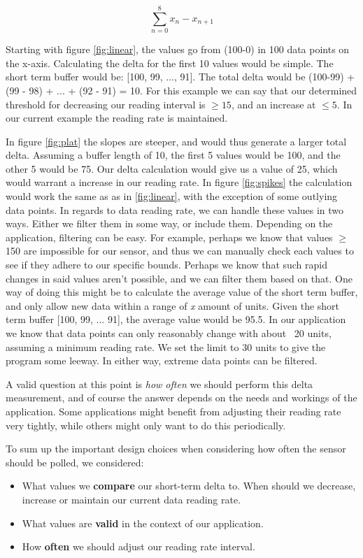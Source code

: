 $$\sum_{n=0}^{8} x_n - x_{n+1}$$

Starting with figure \ref{fig:linear}, the values go from (100-0) in 100 data points on the x-axis. Calculating the delta for the first 10 values would be simple. The short term buffer would be: [100, 99, ..., 91]. The total delta would be (100-99) + (99 - 98) + ... + (92 - 91) = 10. For this example we can say that our determined threshold for decreasing our reading interval is $\geq 15$, and an increase at $\leq 5$. In our current example the reading rate is maintained. 

In figure \ref{fig:plat} the slopes are steeper, and would thus generate a larger total delta. Assuming a buffer length of 10, the first 5 values would be 100, and the other 5 would be 75. Our delta calculation would give us a value of 25, which would warrant a increase in our reading rate. In figure \ref{fig:spikes} the calculation would work the same as as in \ref{fig:linear}, with the exception of some outlying data points. In regards to data reading rate, we can handle these values in two ways. Either we filter them in some way, or include them. Depending on the application, filtering can be easy. For example, perhaps we know that values $\geq$ 150 are impossible for our sensor, and thus we can manually check each values to see if they adhere to our specific bounds. Perhaps we know that such rapid changes in said values aren't possible, and we can filter them based on that. One way of doing this might be to calculate the average value of the short term buffer, and only allow new data within a range of  \textit{x} amount of units. Given the short term buffer [100, 99, ... 91], the average value would be 95.5. In our application we know that data points can only reasonably change with about ~20 units, assuming a minimum reading rate. We set the limit to 30 units to give the program some leeway. In either way, extreme data points can be filtered. 

A valid question at this point is \textit{how often} we should perform this delta measurement, and of course the answer depends on the needs and workings of the application. Some applications might benefit from adjusting their reading rate very tightly, while others might only want to do this periodically. 

To sum up the important design choices when considering how often the sensor should be polled, we considered:
\begin{itemize}
	\item What values we \textbf{compare} our short-term delta to. When should we decrease, increase or maintain our current data reading rate.
	\item What values are \textbf{valid} in the context of our application.
	\item How \textbf{often} we should adjust our reading rate interval.
\end{itemize}

